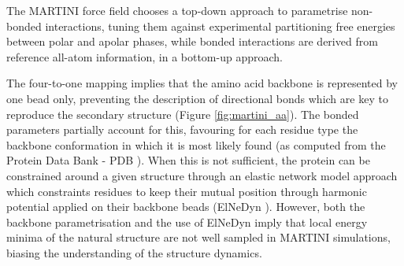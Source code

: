 The MARTINI force field chooses a top-down approach to parametrise non-bonded interactions, tuning them against experimental partitioning free energies between polar and apolar phases, while bonded interactions are derived from reference all-atom information, in a bottom-up approach.

The four-to-one mapping implies that the amino acid backbone is represented by one bead only, preventing the description of directional bonds which are key to reproduce the secondary structure (Figure \ref{fig:martini_aa}). The bonded parameters partially account for this, favouring for each residue type the backbone conformation in which it is most likely found (as computed from the Protein Data Bank - PDB \citep{PDB}). When this is not sufficient, the protein can be constrained around a given structure through an elastic network model approach which constraints residues to keep their mutual position through harmonic potential applied on their backbone beads (ElNeDyn \citep{Periole2009}). However, both the backbone parametrisation and the use of ElNeDyn imply that local energy minima of the natural structure are not well sampled in MARTINI simulations, biasing the understanding of the structure dynamics.

